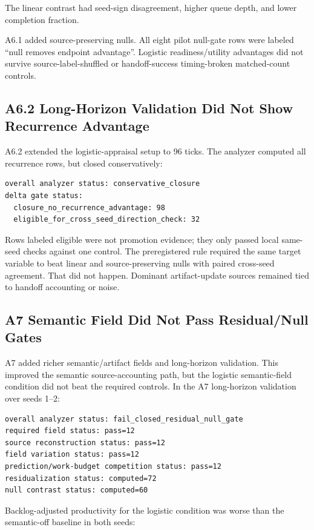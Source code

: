 \documentclass[11pt]{article}
\begin{document}
The linear contrast had seed-sign disagreement, higher queue depth, and lower
completion fraction.

A6.1 added source-preserving nulls. All eight pilot null-gate rows were labeled
``null removes endpoint advantage''. Logistic readiness/utility advantages did
not survive source-label-shuffled or handoff-success timing-broken
matched-count controls.

\subsection{A6.2 Long-Horizon Validation Did Not Show Recurrence Advantage}

A6.2 extended the logistic-appraisal setup to 96 ticks. The analyzer computed
all recurrence rows, but closed conservatively:

\begin{verbatim}
overall analyzer status: conservative_closure
delta gate status:
  closure_no_recurrence_advantage: 98
  eligible_for_cross_seed_direction_check: 32
\end{verbatim}

Rows labeled eligible were not promotion evidence; they only passed local
same-seed checks against one control. The preregistered rule required the same
target variable to beat linear and source-preserving nulls with paired
cross-seed agreement. That did not happen. Dominant artifact-update sources
remained tied to handoff accounting or noise.

\subsection{A7 Semantic Field Did Not Pass Residual/Null Gates}

A7 added richer semantic/artifact fields and long-horizon validation. This
improved the semantic source-accounting path, but the logistic semantic-field
condition did not beat the required controls. In the A7 long-horizon validation
over seeds 1--2:

\begin{verbatim}
overall analyzer status: fail_closed_residual_null_gate
required field status: pass=12
source reconstruction status: pass=12
field variation status: pass=12
prediction/work-budget competition status: pass=12
residualization status: computed=72
null contrast status: computed=60
\end{verbatim}

Backlog-adjusted productivity for the logistic condition was worse than the
semantic-off baseline in both seeds:
\end{document}

